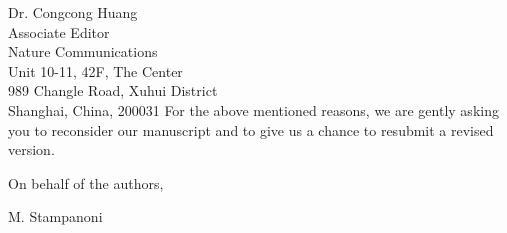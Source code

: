 \documentclass[a4paper,english]{scrlttr2}
\begin{document}
\begin{letter}{Dr. Congcong Huang\\

Associate Editor\\
Nature Communications \\

Unit 10-11, 42F, The Center\\
989 Changle Road, Xuhui District\\
Shanghai, China, 200031}
For the above mentioned reasons, we are gently asking you to reconsider our
manuscript and to give us a chance to resubmit a revised version.

\closing{On behalf of the authors,}

M. Stampanoni
\end{letter}
\end{document}
